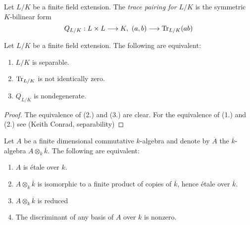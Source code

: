\begin{definition}
	Let $L/K$ be a finite field extension. The \textit{trace pairing for $L/K$} is the symmetric $K$-bilinear form
	\[
		Q_{L/K} : L \times L \longrightarrow K,\ (a,b) \longrightarrow \operatorname{Tr}_{L/K}(ab)
	\]
\end{definition}

\begin{lemma}
	Let $L/K$ be a finite field extension. The following are equivalent:
	\begin{enumerate}
		\item $L/K$ is separable.
		\item $\operatorname{Tr}_{L/K}$ is not identically zero.
		\item $Q_{L/K}$ is nondegenerate.
	\end{enumerate}
\end{lemma}

\begin{proof}
	The equivalence of (2.) and (3.) are clear.
	For the equivalence of (1.) and (2.) see (Keith Conrad, separability)
\end{proof}

\begin{theorem}
	Let $A$ be a finite dimensional commutative $k$-algebra and denote by $\overline{A}$ the $\overline{k}$-algebra $A \otimes_k \overline{k}$. The following are equivalent:
	\begin{enumerate}
		\item $A$ is \'etale over $k$.\label{etale}
		\item $A \otimes_k \overline{k}$ is isomorphic to a finite product of copies of $\overline{k}$, hence \'etale over $\overline{k}$.\label{product}
		\item $A \otimes_k \overline{k}$ is reduced
		\item The discriminant of any basis of $A$ over $k$ is nonzero.\label{trace}
	\end{enumerate}
\end{theorem}


